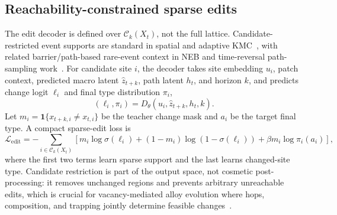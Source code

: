 \documentclass{article}
\begin{document}
\subsection{Reachability-constrained sparse edits}

The edit decoder is defined over $\mathcal{C}_k(X_t)$, not the full lattice. Candidate-restricted event supports are standard in spatial and adaptive KMC~\cite{chatterjee2007kmc,henkelman2001akmc,zamora2016spectad}, with related barrier/path-based rare-event context in NEB and time-reversal path-sampling work~\cite{henkelman2000neb,liu2023trps}. For candidate site $i$, the decoder takes site embedding $u_i$, patch context, predicted macro latent $\hat{z}_{t+k}$, path latent $h_t$, and horizon $k$, and predicts change logit $\ell_i$ and final type distribution $\pi_i$,
\begin{equation}
(\ell_i,\pi_i)=D_\theta(u_i,\hat{z}_{t+k},h_t,k).
\end{equation}
Let $m_i=\mathbf{1}\{x_{t+k,i}\neq x_{t,i}\}$ be the teacher change mask and $a_i$ be the target final type. A compact sparse-edit loss is
\begin{equation}
\mathcal{L}_{\mathrm{edit}}
=
-\sum_{i\in\mathcal{C}_k(X_t)}
\left[
m_i\log\sigma(\ell_i)
+(1-m_i)\log(1-\sigma(\ell_i))
+\beta m_i\log \pi_i(a_i)
\right],
\end{equation}
where the first two terms learn sparse support and the last learns changed-site type. Candidate restriction is part of the output space, not cosmetic post-processing: it removes unchanged regions and prevents arbitrary unreachable edits, which is crucial for vacancy-mediated alloy evolution where hops, composition, and trapping jointly determine feasible changes~\cite{soisson1996cufe,soisson2007cufe}.
\end{document}
